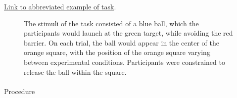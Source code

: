 \documentclass[
  11pt,
  letterpaper,
]{article}
\makeatletter
\let\oldparagraph\paragraph
\renewcommand{\paragraph}{
    \@ifstar
      \xxxParagraphStar
      \xxxParagraphNoStar
  }
\newcommand{\xxxParagraphStar}[1]{\oldparagraph*{#1}\mbox{}}
\newcommand{\xxxParagraphNoStar}[1]{\oldparagraph{#1}\mbox{}}
\makeatother
\begin{document}
\href{https://pcl.sitehost.iu.edu/tg/demos/igas_expt1_demo.html}{Link to
abbreviated example of task}.

\begin{figure}


\caption{\label{fig-IGAS_Methods}The stimuli of the task consisted of a
blue ball, which the participants would launch at the green target,
while avoiding the red barrier. On each trial, the ball would appear in
the center of the orange square, with the position of the orange square
varying between experimental conditions. Participants were constrained
to release the ball within the square.}

\end{figure}%

\paragraph{Procedure}\label{procedure}
\end{document}
